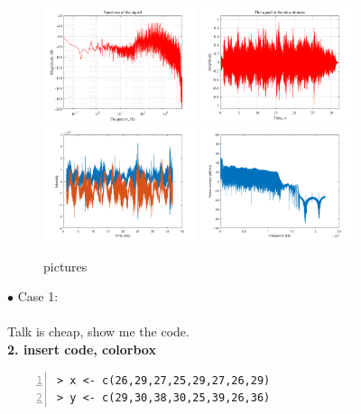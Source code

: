 \documentclass[10pt]{article} %
\begin{document}
\begin{figure}[H] %
  \centering
  \includegraphics[width=0.4\textwidth]{m1.png}
  \includegraphics[width=0.4\textwidth]{m2.png}
  \includegraphics[width=0.4\textwidth]{m3.png}
  \includegraphics[width=0.4\textwidth]{m4.png}
  \caption{pictures}\label{}
\end{figure}

$\bullet$ Case 1:\\
\\[10pt]
Talk is cheap, show me the code.\\

\textbf{2. insert code, colorbox}
\begin{colorboxed}
\begin{lstlisting}[language={[ANSI]R},numbers=left,numberstyle=\tiny,frame=shadowbox,
   rulesepcolor=\color{red!20!green!20!blue!20},
   keywordstyle=\color{blue!70!black},
   commentstyle=\color{blue!90!},
   basicstyle=\ttfamily]
> x <- c(26,29,27,25,29,27,26,29)
> y <- c(29,30,38,30,25,39,26,36)
\end{lstlisting}
\end{colorboxed}
\end{document}
